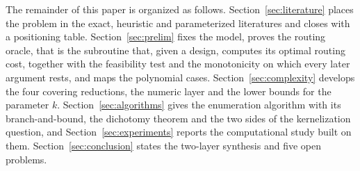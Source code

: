 The remainder of this paper is organized as follows.
Section~\ref{sec:literature} places the problem in the exact, heuristic and
parameterized literatures and closes with a positioning table.
Section~\ref{sec:prelim} fixes the model, proves the routing oracle,
that is the subroutine that, given a design, computes its optimal
routing cost, together with the
feasibility test and the monotonicity on which every later argument
rests, and maps the polynomial cases. Section~\ref{sec:complexity}
develops the four covering reductions, the numeric layer and the lower
bounds for the parameter $k$. Section~\ref{sec:algorithms} gives the
enumeration algorithm with its branch-and-bound, the dichotomy theorem
and the two sides of the kernelization question, and
Section~\ref{sec:experiments} reports the computational study built on
them. Section~\ref{sec:conclusion} states the two-layer synthesis and
five open problems.

